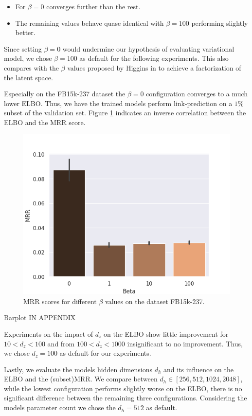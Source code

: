 \begin{itemize}
    \item For $\beta = 0$ converges further than the rest.
    \item The remaining values behave quase identical with $\beta = 100$ performing slightly better. 
\end{itemize}

Since setting $\beta = 0$ would undermine our hypothesis of evaluating variational model, we chose $\beta = 100$ as default for the following experiments. This also compares with the $\beta$ values proposed by Higgins in \cite{higgins_beta-vae_2016} to achieve a factorization of the latent space.

Especially on the FB15k-237 dataset the $\beta = 0$ configuration converges to a much lower ELBO. Thus, we have the trained models perform link-prediction on a $1\%$ subset of the validation set. Figure \ref{fig5:betafbmrr} indicates an inverse correlation between the ELBO and the MRR score. 

\begin{figure}[H]
    \centering
      \includegraphics[width=.45\textwidth]{graphs/plots/beta_mrr_fb.png}
      \caption{MRR scores for different $\beta$ values on the dataset FB15k-237.}
      \label{fig5:betafbmrr}
\end{figure}

Barplot IN APPENDIX  

Experiments on the impact of $d_z$ on the ELBO show little improvement for $10<d_z<100$ and from $100<d_z<1000$ insignificant to no improvement. Thus, we chose $d_z=100$ as default for our experiments.


Lastly, we evaluate the models hidden dimensions $d_h$ and its influence on the ELBO and the (subset)MRR. We compare between $d_h\in [256, 512, 1024, 2048]$, while the lowest configuration performs slightly worse on the ELBO, there is no significant difference between the remaining three configurations. Considering the models parameter count we chose the $d_h=512$ as default.


